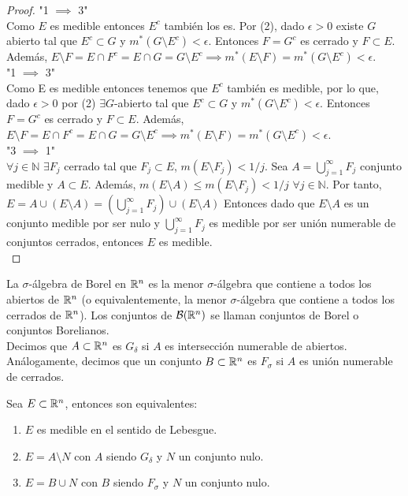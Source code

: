 \begin{proof}
    "1 $\implies$ 3"\\
    Como $E$ es medible entonces $E^c$ también los es. Por (2), dado $\epsilon > 0$ existe $G$ abierto tal que $E^c \subset G$ y $m^*(G \setminus E^c) < \epsilon$. Entonces $F = G^c$ es cerrado y $F \subset E$. Además, $E \setminus F = E \cap F^c = E \cap G = G \setminus E^c \implies m^*(E \setminus F) = m^*(G \setminus E^c) < \epsilon$.\\
    "1 $\implies$ 3"\\
    Como E es medible entonces tenemos que $E^c$ también es medible, por lo que, dado $\epsilon > 0$ por (2) $\exists G$-abierto tal que $E^c \subset G$ y $m^*(G \setminus E^c) < \epsilon$. Entonces $F = G^c$ es cerrado y $F \subset E$. Además, $E \setminus F = E \cap F^c = E \cap G = G \setminus E^c \implies m^*(E \setminus F) = m^*(G \setminus E^c) < \epsilon$.\\
    "3 $\implies$ 1"\\
    $\forall j \in \mathbb{N}$ $\exists F_j$ cerrado tal que $F_j \subset E$, $m(E \setminus F_j) < 1/j$. Sea $A = \bigcup_{j = 1}^{\infty} F_j$ conjunto medible y $A \subset E$. Además, $m(E \setminus A) \leq m(E \setminus F_j) < 1/j$ $\forall j \in \mathbb{N}$. Por tanto, $E = A \cup (E\setminus A) = (\bigcup_{j = 1}^{\infty}F_j) \cup (E\setminus A)$ Entonces dado que $E\setminus A$ es un conjunto medible por ser nulo y $\bigcup_{j = 1}^{\infty}F_j$ es medible por ser unión numerable de conjuntos cerrados, entonces $E$ es medible.\\

\end{proof}

\label{sigma-Algebra de Borel}
\begin{definición}
La $\sigma$-álgebra de Borel en $\mathbb{R}^n$ es la menor $\sigma$-álgebra que contiene a todos los abiertos de $\mathbb{R}^n$ (o equivalentemente, la menor $\sigma$-álgebra que contiene a todos los cerrados de $\mathbb{R}^n$). Los conjuntos de $\mathcal{B}(\mathbb{R}^n)$ se llaman conjuntos de Borel o conjuntos Borelianos.\\
Decimos que $A \subset \mathbb{R}^n$ es $G_\delta$ si $A$ es intersección numerable de abiertos. Análogamente, decimos que un conjunto $B \subset \mathbb{R}^n$ es $F_\sigma$ si $A$ es unión numerable de cerrados.
\end{definición}

\begin{corolario}
    Sea $E \subset \mathbb{R}^n$, entonces son equivalentes:
    \begin{enumerate}
        \item $E$ es medible en el sentido de Lebesgue.
        \item $E = A \setminus N$ con $A$ siendo $G_\delta$ y $N$ un conjunto nulo.
        \item $E = B \cup N$ con $B$ siendo $F_\sigma$ y $N$ un conjunto nulo.
    \end{enumerate}
\end{corolario}

